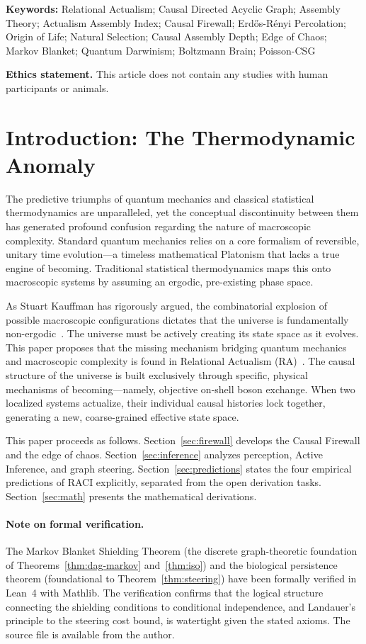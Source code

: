 \documentclass[11pt,a4paper]{article}
\theoremstyle{plain}
\theoremstyle{definition}
\theoremstyle{remark}
\begin{document}
\noindent\textbf{Keywords:} Relational Actualism; Causal Directed Acyclic Graph;
Assembly Theory; Actualism Assembly Index; Causal Firewall; Erd\H{o}s-R\'{e}nyi
Percolation; Origin of Life; Natural Selection; Causal Assembly Depth; Edge of
Chaos; Markov Blanket; Quantum Darwinism; Boltzmann Brain; Poisson-CSG

\medskip
\noindent\textbf{Ethics statement.}
This article does not contain any studies with human participants or animals.

\section{Introduction: The Thermodynamic Anomaly}

The predictive triumphs of quantum mechanics and classical statistical
thermodynamics are unparalleled, yet the conceptual discontinuity between them has
generated profound confusion regarding the nature of macroscopic complexity.
Standard quantum mechanics relies on a core formalism of reversible, unitary time
evolution---a timeless mathematical Platonism that lacks a true engine of becoming.
Traditional statistical thermodynamics maps this onto macroscopic systems by
assuming an ergodic, pre-existing phase space.

As Stuart Kauffman has rigorously argued, the combinatorial explosion of possible
macroscopic configurations dictates that the universe is fundamentally
non-ergodic~\citep{Kauffman2000}. The universe must be actively creating its state
space as it evolves. This paper proposes that the missing mechanism bridging
quantum mechanics and macroscopic complexity is found in Relational Actualism
(RA)~\citep{Sandeman2026a}. The causal structure of the universe is built
exclusively through specific, physical mechanisms of becoming---namely, objective
on-shell boson exchange. When two localized systems actualize, their individual
causal histories lock together, generating a new, coarse-grained effective state
space.

This paper proceeds as follows. Section~\ref{sec:firewall} develops the Causal
Firewall and the edge of chaos. Section~\ref{sec:inference} analyzes perception,
Active Inference, and graph steering. Section~\ref{sec:predictions} states the
four empirical predictions of RACI explicitly, separated from the open derivation
tasks. Section~\ref{sec:math} presents the mathematical derivations.

\paragraph{Note on formal verification.}
The Markov Blanket Shielding Theorem (the discrete graph-theoretic foundation of
Theorems~\ref{thm:dag-markov} and~\ref{thm:iso}) and the biological persistence
theorem (foundational to Theorem~\ref{thm:steering}) have been formally verified
in Lean~4 with Mathlib. The verification confirms that the logical structure
connecting the shielding conditions to conditional independence, and Landauer's
principle to the steering cost bound, is watertight given the stated axioms.
The source file is available from the author.
\end{document}
